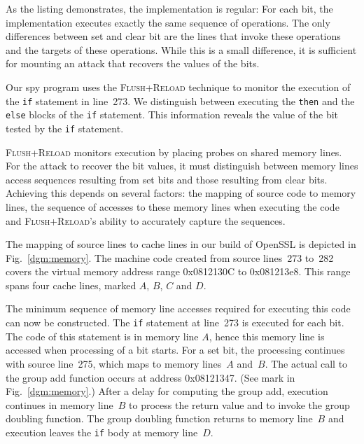 \documentclass[twocolumn]{article}
\newcommand{\fl}{\textsc{Flu\-sh+\allowbreak Re\-load}\xspace}
\begin{document}
As the listing demonstrates, the implementation is regular: For each bit, the implementation executes exactly the same sequence of operations.
The only differences between set and clear bit are the lines that invoke these operations and the targets of these operations.
While this is a small difference, it is sufficient for mounting an attack that recovers 
the values of the bits.


Our spy program uses the \fl technique to monitor the execution of the \texttt{if}
statement in line~273.
We distinguish between executing the \texttt{then} and the \texttt{else} blocks of the \texttt{if}
statement.
This information reveals the value of the bit tested by the \texttt{if} statement.

\fl monitors execution by placing probes on shared memory lines.
For the attack to recover the bit values, it must distinguish between memory lines access sequences
resulting from set bits and those resulting from clear bits.
Achieving this depends on several factors: the mapping of source code to memory lines, 
the sequence of accesses to these memory lines when executing the code and 
\fl's ability to accurately capture the sequences.


The mapping of source lines to cache lines in our build of OpenSSL is depicted in Fig.~\ref{dgm:memory}.
The machine code created from source lines~273 to~282 covers the virtual memory address range 0x0812130C
to 0x081213e8.
This range spans four cache lines, marked $A$, $B$, $C$ and $D$.




The minimum sequence of memory line accesses required for executing this code can now be constructed.
The \texttt{if} statement at line~273 is executed for each bit.  
The code of this statement is in memory line $A$, hence this memory line is accessed when processing of a bit starts.
For a set bit, the processing continues with source line~275, which maps to memory lines~$A$ and~$B$.
The actual call to the group add function occurs at address 0x08121347.
(See mark in Fig.~\ref{dgm:memory}.)
After a delay for computing the group add, execution continues in memory line~$B$ to process the return value and 
to invoke the group doubling function.
The group doubling function returns to memory line~$B$ and execution leaves the \texttt{if} body at memory line~$D$.
\end{document}
